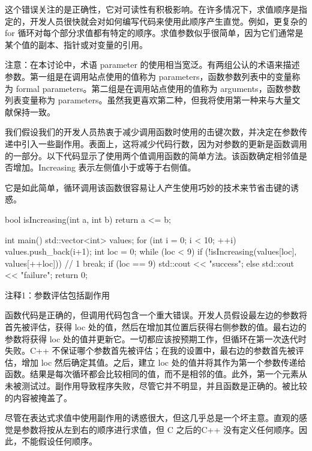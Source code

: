 这个错误关注的是正确性，它对可读性有积极影响。在许多情况下，求值顺序是指定的，开发人员很快就会对如何编写代码来使用此顺序产生直觉。例如，更复杂的 for 循环对每个部分求值都有特定的顺序。求值参数似乎很简单，因为它们通常是某个值的副本、指针或对变量的引用。

注意：在本讨论中，术语 parameter 的使用相当宽泛。有两组公认的术语来描述参数。第一组是在调用站点使用的值称为 parameters，函数参数列表中的变量称为 formal parameters。第二组是在调用站点使用的值称为 arguments，函数参数列表变量称为 parameters。虽然我更喜欢第二种，但我将使用第一种来与大量文献保持一致。


我们假设我们的开发人员热衷于减少调用函数时使用的击键次数，并决定在参数传递中引入一些副作用。表面上，这将减少代码行数，因为对参数的更新是函数调用的一部分。以下代码显示了使用两个值调用函数的简单方法。该函数确定相邻值是否增加。Increasing 表示左侧值小于或等于右侧值。

它是如此简单，循环调用该函数很容易让人产生使用巧妙的技术来节省击键的诱惑。


\begin{cpp}
bool isIncreasing(int a, int b) {
  return a <= b;
}

int main() {
  std::vector<int> values;
  for (int i = 0; i < 10; ++i)
    values.push_back(i+1);
  int loc = 0;
  while (loc < 9) {
    if (!isIncreasing(values[loc], values[++loc])) // 1
      break;
  }
  if (loc == 9)
    std::cout << "success\n";
  else
    std::cout << "failure\n";
  return 0;
}
\end{cpp}

{\footnotesize
注释1：参数评估包括副作用
}


函数代码是正确的，但调用代码包含一个重大错误。开发人员假设最左边的参数将首先被评估，获得 loc 处的值，然后在增加其位置后获得右侧参数的值。最右边的参数将获得 loc 处的值并更新它。一切都应该按预期工作，但循环在第一次迭代时失败。C++ 不保证哪个参数首先被评估；在我的设置中，最右边的参数首先被评估，增加 loc 然后确定其值。之后，建立 loc 处的值并将其作为第一个参数传递给函数。结果是每次循环都会比较相同的值，而不是相邻的值。此外，第一个元素从未被测试过。副作用导致程序失败，尽管它并不明显，并且函数是正确的。被比较的内容被掩盖了。


尽管在表达式求值中使用副作用的诱惑很大，但这几乎总是一个坏主意。直观的感觉是参数将按从左到右的顺序进行求值，但 C 之后的C++ 没有定义任何顺序。因此，不能假设任何顺序。

